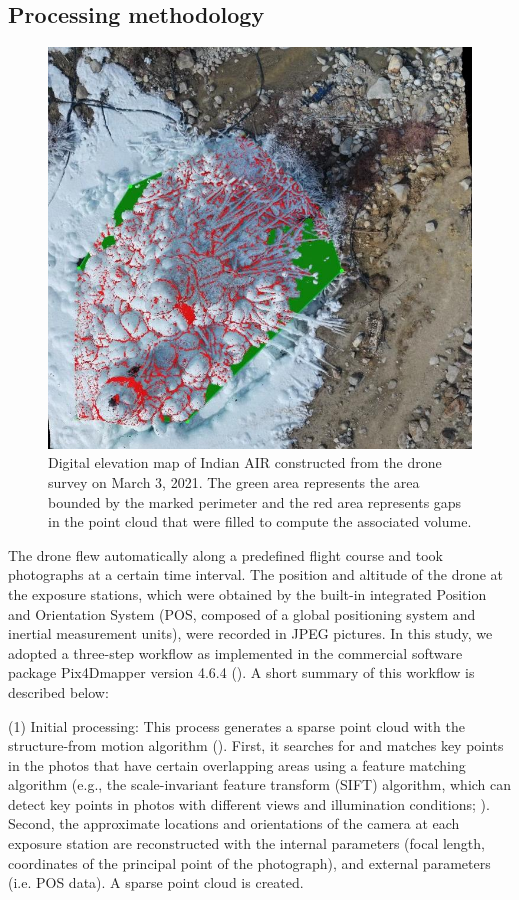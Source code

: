 \subsection{Processing methodology}
\label{sec:drone_method}

\begin{figure}
	\begin{center}
		\includegraphics[width=12 cm]{figs/pix4d.jpg}
	\end{center}
	\caption{Digital elevation map of Indian AIR constructed from the drone survey on March 3, 2021. The green
		area represents the area bounded by the marked perimeter and the red area represents gaps in the point cloud
    that were filled to compute the associated volume.
	}
	\label{fig:DEM}
\end{figure}

The drone flew automatically along a predefined flight course and took photographs at a certain time interval. The
position and altitude of the drone at the exposure stations, which were obtained by the built-in integrated
Position and Orientation System (POS, composed of a global positioning system and inertial measurement units),
were recorded in JPEG pictures. In this study, we adopted a three-step workflow as implemented in the
commercial software package Pix4Dmapper version 4.6.4 (\cite{pix4dsaPix4DmapperUserManual2020}). A short summary of this workflow is
described below:

(1) Initial processing: This process generates a sparse point cloud with the structure-from motion algorithm
(\cite{turnerAutomatedTechniqueGenerating2012}). First, it searches for and matches key points in the photos that have certain overlapping
areas using a feature matching algorithm (e.g., the scale-invariant feature transform (SIFT) algorithm, which can
detect key points in photos with different views and illumination conditions;
\cite{loweDistinctiveImageFeatures2004}). Second, the approximate locations and orientations of the camera at
each exposure station are reconstructed with the internal parameters (focal length, coordinates of the principal
point of the photograph), and external parameters (i.e. POS data). A sparse point cloud is created.

